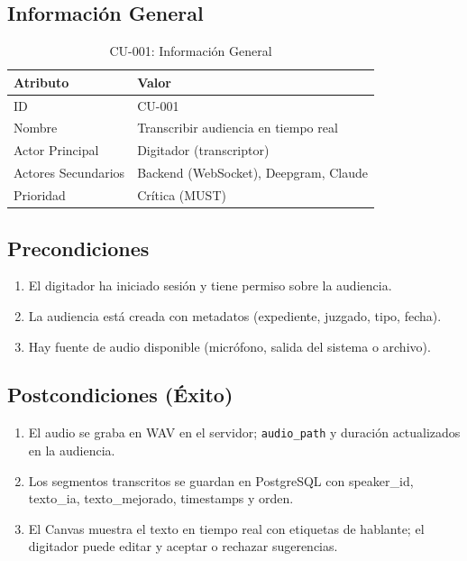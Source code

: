 \documentclass[12pt,a4paper]{report}
\begin{document}
\subsection{Información General}

\begin{table}[H]
\centering
\small
\begin{tabular}{|p{3.5cm}|p{9.5cm}|}
\hline
\rowcolor{primaryblue!20}
\textbf{Atributo} & \textbf{Valor} \\
\hline
ID & CU-001 \\
\hline
Nombre & Transcribir audiencia en tiempo real \\
\hline
Actor Principal & Digitador (transcriptor) \\
\hline
Actores Secundarios & Backend (WebSocket), Deepgram, Claude \\
\hline
Prioridad & Crítica (MUST) \\
\hline
\end{tabular}
\caption{CU-001: Información General}
\end{table}

\subsection{Precondiciones}

\begin{enumerate}
    \item El digitador ha iniciado sesión y tiene permiso sobre la audiencia.
    \item La audiencia está creada con metadatos (expediente, juzgado, tipo, fecha).
    \item Hay fuente de audio disponible (micrófono, salida del sistema o archivo).
\end{enumerate}

\subsection{Postcondiciones (Éxito)}

\begin{enumerate}
    \item El audio se graba en WAV en el servidor; \texttt{audio\_path} y duración actualizados en la audiencia.
    \item Los segmentos transcritos se guardan en PostgreSQL con speaker\_id, texto\_ia, texto\_mejorado, timestamps y orden.
    \item El Canvas muestra el texto en tiempo real con etiquetas de hablante; el digitador puede editar y aceptar o rechazar sugerencias.
\end{enumerate}
\end{document}

